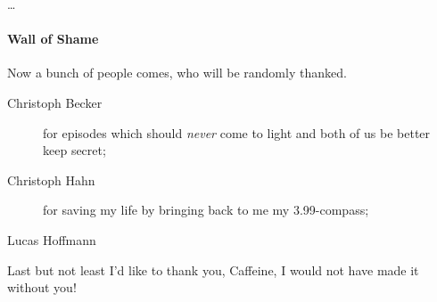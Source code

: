 

\begin{acknowledgements}
\dots{}

\paragraph{Wall of Shame}
Now a bunch of people comes, who will be randomly thanked.

\begin{description}
	\item[Christoph Becker] for episodes which should \emph{never} come to light and both of us be better keep secret; 
	\item[Christoph Hahn] for saving my life by bringing back to me my \SI{3.99}{\EUR}-compass;
	\item[Lucas Hoffmann]
\end{description}



Last but not least I'd like to thank you, Caffeine, I would not have made it without you!


\end{acknowledgements}
